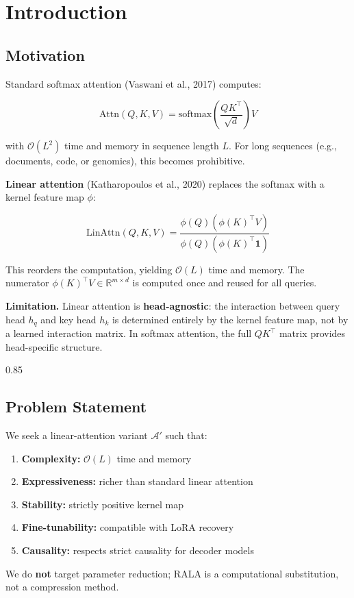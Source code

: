 
\section{Introduction}

\subsection{Motivation}

Standard softmax attention (Vaswani et al., 2017) computes:

\[
\text{Attn}(Q, K, V) = \text{softmax}\!\left(\frac{Q K^\top}{\sqrt{d}}\right) V
\tag{1.1}
\]

with $\mathcal{O}(L^2)$ time and memory in sequence length $L$. For long 
sequences (e.g., documents, code, or genomics), this becomes prohibitive.

\textbf{Linear attention} (Katharopoulos et al., 2020) replaces the softmax with 
a kernel feature map $\phi$:

\[
\text{LinAttn}(Q, K, V) = \frac{\phi(Q) \left(\phi(K)^\top V\right)}{\phi(Q) \left(\phi(K)^\top \mathbf{1}\right)}
\tag{1.2}
\]

This reorders the computation, yielding $\mathcal{O}(L)$ time and memory. 
The numerator $\phi(K)^\top V \in \mathbb{R}^{m \times d}$ is computed once 
and reused for all queries.

\textbf{Limitation.} Linear attention is \textbf{head-agnostic}: the interaction between 
query head $h_q$ and key head $h_k$ is determined entirely by the kernel 
feature map, not by a learned interaction matrix. In softmax attention, the 
full $QK^\top$ matrix provides head-specific structure.

0.85


\subsection{Problem Statement}

We seek a linear-attention variant $\mathcal{A}'$ such that:

\begin{enumerate}
\item \textbf{Complexity:} $\mathcal{O}(L)$ time and memory
\item \textbf{Expressiveness:} richer than standard linear attention
\item \textbf{Stability:} strictly positive kernel map
\item \textbf{Fine-tunability:} compatible with LoRA recovery
\item \textbf{Causality:} respects strict causality for decoder models

\end{enumerate}
We do \textbf{not} target parameter reduction; RALA is a computational substitution, 
not a compression method.

